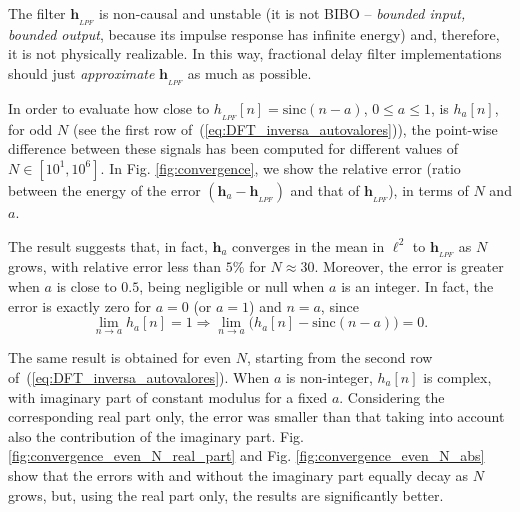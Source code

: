 The filter $ \mathbf{h}_{_{LPF}} $ is non-causal and unstable (it is not BIBO -- \emph{bounded input, bounded output}, because its impulse response has infinite energy) and, therefore, it is not physically realizable. In this way, fractional delay filter implementations should just \emph{approximate} $ \mathbf{h}_{_{LPF}} $ as much as possible.

In order to evaluate how close to $ h_{_{LPF}}[n] = \mathrm{sinc} (n-a) $, $ 0\leq a \leq 1 $, is $h_a[n]$, for odd $N$ (see the first row of~(\ref{eq:DFT_inversa_autovalores})), the point-wise difference between these signals has been computed for different values of $ N \in [10^1, 10^6]$. In Fig. \ref{fig:convergence}, we show the relative error  (ratio between the energy of the error $(\mathbf{h}_a - \mathbf{h}_{_{LPF}})$ and that of $ \mathbf{h}_{_{LPF}} $), in terms of $ N $ and $a $.

The result suggests that, in fact, $ \mathbf{h}_a $ converges in the mean in $ \ell^2 $ to $ \mathbf{h}_{_{LPF}}$ as $ N $ grows, with relative error less than $ 5\% $ for $ N \approx 30 $. Moreover, the error is greater when $ a $ is close to $ 0{.}5 $, being negligible or null when $ a $ is an integer. In fact, the error is exactly zero for $ a=0$ (or $a=1$) and $ n = a $, since
\begin{equation}\label{eq:lim_h_impar}
\lim_{n \rightarrow a} h_{a}[n] = 1
\Rightarrow
\lim_{n \rightarrow a} \big(h_{a}[n] - \mathrm{sinc}(n-a)\big) = 0.
\end{equation}

The same result is obtained for even $N$, starting from the second row of~(\ref{eq:DFT_inversa_autovalores}). When $a$ is non-integer, $h_a[n] $ is complex, with imaginary part of constant modulus for a fixed $a$. Considering the corresponding real part only, the error was smaller than that taking into account also the contribution of the imaginary part. Fig. \ref{fig:convergence_even_N_real_part} and Fig. \ref{fig:convergence_even_N_abs} show that the errors with and without the imaginary part equally decay as  $ N $ grows, but, using the real part only, the results are significantly better.

